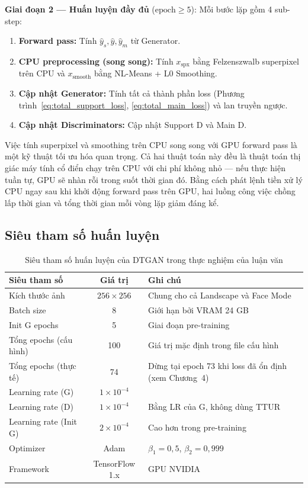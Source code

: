 \textbf{Giai đoạn 2 --- Huấn luyện đầy đủ} ($\text{epoch} \geq 5$): Mỗi bước lặp gồm 4 sub-step:
\begin{enumerate}
    \item \textbf{Forward pass:} Tính $\widehat{y}_s, \widehat{y}, \widehat{y}_m$ từ Generator.
    \item \textbf{CPU preprocessing (song song):} Tính $x_{\text{spx}}$ bằng Felzenszwalb superpixel trên CPU và $x_{\text{smooth}}$ bằng NL-Means + L0 Smoothing.
    \item \textbf{Cập nhật Generator:} Tính tất cả thành phần loss (Phương trình~\ref{eq:total_support_loss}, \ref{eq:total_main_loss}) và lan truyền ngược.
    \item \textbf{Cập nhật Discriminators:} Cập nhật Support D và Main D.
\end{enumerate}

Việc tính superpixel và smoothing trên CPU song song với GPU forward pass là một kỹ thuật tối ưu hóa quan trọng. Cả hai thuật toán này đều là thuật toán thị giác máy tính cổ điển chạy trên CPU với chi phí không nhỏ --- nếu thực hiện tuần tự, GPU sẽ nhàn rỗi trong suốt thời gian đó. Bằng cách phát lệnh tiền xử lý CPU ngay sau khi khởi động forward pass trên GPU, hai luồng công việc chồng lấp thời gian và tổng thời gian mỗi vòng lặp giảm đáng kể.

\subsection{Siêu tham số huấn luyện}
\label{subsec:hyperparams}

\begin{table}[H]
\caption{Siêu tham số huấn luyện của DTGAN trong thực nghiệm của luận văn}
\label{tab:hyperparams}
\centering
\begin{tabular}{|l|c|p{6cm}|}
\hline
\textbf{Siêu tham số} & \textbf{Giá trị} & \textbf{Ghi chú} \\
\hline
Kích thước ảnh & $256 \times 256$ & Chung cho cả Landscape và Face Mode \\
\hline
Batch size & 8 & Giới hạn bởi VRAM 24 GB \\
\hline
Init G epochs & 5 & Giai đoạn pre-training \\
\hline
Tổng epochs (cấu hình) & 100 & Giá trị mặc định trong file cấu hình \\
\hline
Tổng epochs (thực tế) & 74 & Dừng tại epoch 73 khi loss đã ổn định (xem Chương~4) \\
\hline
Learning rate (G) & $1 \times 10^{-4}$ & \\
\hline
Learning rate (D) & $1 \times 10^{-4}$ & Bằng LR của G, không dùng TTUR \\
\hline
Learning rate (Init G) & $2 \times 10^{-4}$ & Cao hơn trong pre-training \\
\hline
Optimizer & Adam & $\beta_1 = 0{,}5$, $\beta_2 = 0{,}999$ \\
\hline
Framework & TensorFlow 1.x & GPU NVIDIA \\
\hline
\end{tabular}
\end{table}

